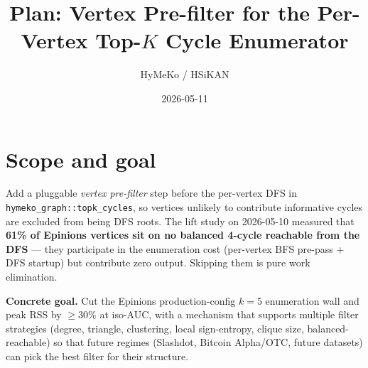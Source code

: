 \documentclass[11pt,a4paper]{article}
\title{Plan: Vertex Pre-filter for the Per-Vertex Top-$K$ Cycle Enumerator}
\author{HyMeKo / HSiKAN}
\date{2026-05-11}
\begin{document}
\maketitle

\section{Scope and goal}
Add a pluggable \emph{vertex pre-filter} step before the per-vertex DFS in
\texttt{hymeko\_graph::topk\_cycles}, so vertices unlikely to contribute
informative cycles are excluded from being DFS roots.  The lift study on
2026-05-10 measured that \textbf{61\% of Epinions vertices sit on no
balanced 4-cycle reachable from the DFS} --- they participate in the
enumeration cost (per-vertex BFS pre-pass + DFS startup) but contribute
zero output.  Skipping them is pure work elimination.

\textbf{Concrete goal.} Cut the Epinions production-config $k{=}5$
enumeration wall and peak RSS by $\geq 30\%$ at iso-AUC, with a
mechanism that supports multiple filter strategies (degree, triangle,
clustering, local sign-entropy, clique size, balanced-reachable) so
that future regimes (Slashdot, Bitcoin Alpha/OTC, future datasets) can
pick the best filter for their structure.
\end{document}
